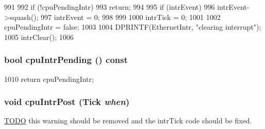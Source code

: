 \begin{DoxyCode}
991 {
992     if (!cpuPendingIntr)
993         return;
994 
995     if (intrEvent) {
996         intrEvent->squash();
997         intrEvent = 0;
998     }
999 
1000     intrTick = 0;
1001 
1002     cpuPendingIntr = false;
1003 
1004     DPRINTF(EthernetIntr, "clearing interrupt\n");
1005     intrClear();
1006 }
\end{DoxyCode}
\hypertarget{classNSGigE_a8f53e358ba260670dbc7296b35482316}{
\subsubsection[{cpuIntrPending}]{\setlength{\rightskip}{0pt plus 5cm}bool cpuIntrPending () const}}
\label{classNSGigE_a8f53e358ba260670dbc7296b35482316}



\begin{DoxyCode}
1010 { return cpuPendingIntr; }
\end{DoxyCode}
\hypertarget{classNSGigE_af1fc872917f4ac5efa0d55c5c139bc9a}{
\subsubsection[{cpuIntrPost}]{\setlength{\rightskip}{0pt plus 5cm}void cpuIntrPost ({\bf Tick} {\em when})}}
\label{classNSGigE_af1fc872917f4ac5efa0d55c5c139bc9a}


\begin{Desc}
\item[\hyperlink{todo__todo000066}{TODO}]this warning should be removed and the intrTick code should be fixed. \end{Desc}




